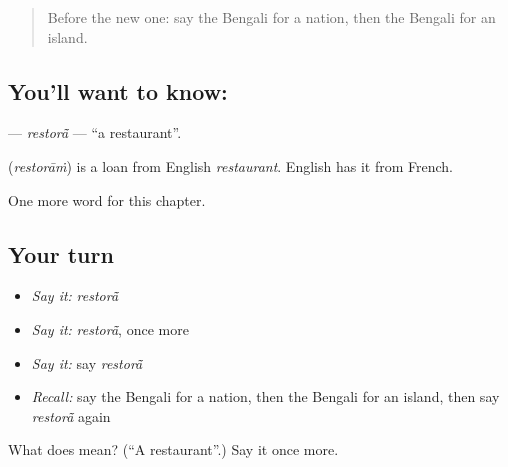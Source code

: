 \label{lesson:BN-C244-restora}



\begin{quote}
Before the new one: say the Bengali for a nation, then the Bengali for an island.
\end{quote}

\subsection*{You'll want to know: }
\textbf{} — \emph{restorā̃} — \textquotedblleft{}a restaurant\textquotedblright{}.

\begin{cousinweb}
\textbf{} (\emph{restorāṁ}) is a loan from English \emph{restaurant}. English has it from French.
\end{cousinweb}

\begin{grammarlens}[title={What you've built}]
One more word for this chapter.
\end{grammarlens}

\subsection*{Your turn}
\begin{itemize}
\raggedright
  \item \emph{Say it:} \emph{restorā̃}
  \item \emph{Say it:} \emph{restorā̃}, once more
  \item \emph{Say it:} say \emph{restorā̃}
  \item \emph{Recall:} say the Bengali for a nation, then the Bengali for an island, then say \emph{restorā̃} again
\end{itemize}

\begin{tcolorbox}[breakable,colback=teal!4,colframe=teal!35!black,title={Before you move on}]
What does  mean? (\textquotedblleft{}A restaurant\textquotedblright{}.) Say it once more.
\end{tcolorbox}
